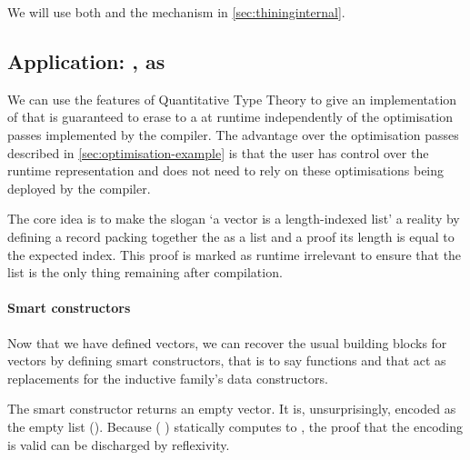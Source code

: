 \noindent
\begin{minipage}[t]{0.55\textwidth}
\end{minipage}\hfill
\begin{minipage}[t]{0.4\textwidth}
\end{minipage}

We will use both  and the  mechanism in
\cref{sec:thininginternal}.

\subsection{Application: , as }\label{sec:vectaslist}

We can use the features of Quantitative Type Theory to give an implementation
of  that is guaranteed to erase to a  at runtime
independently of the optimisation passes implemented by the compiler.
%
The advantage over the optimisation passes described in \cref{sec:optimisation-example}
is that the user has control over the runtime representation and does not need to
rely on these optimisations being deployed by the compiler.

The core idea is to make the slogan `a vector is a length-indexed list' a reality
by defining a record packing together the  as a list and
a proof its length is equal to the expected  index.
%
This proof is marked as runtime irrelevant to ensure that the list is the only
thing remaining after compilation.


\paragraph{Smart constructors}
Now that we have defined vectors,
we can recover the usual building blocks for vectors by defining smart
constructors, that is to say functions  and
\IdrisFunction{(::)} that act as replacements for the inductive
family's data constructors.


The smart constructor  returns an empty vector.
It is, unsurprisingly, encoded as the empty list (\IdrisData{[]}).
%
Because ( \IdrisData{[]}) statically computes to
, the proof that the encoding is valid can be discharged by
reflexivity.

